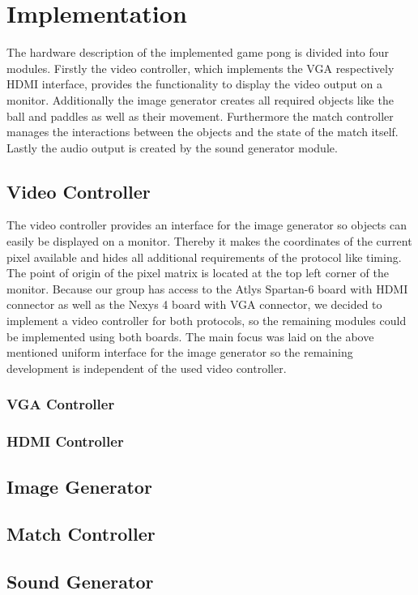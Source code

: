 \section{Implementation}
The hardware description of the implemented game pong is divided into four modules. Firstly the video controller, which implements the VGA respectively HDMI interface, provides the functionality to display the video output on a monitor. Additionally the image generator creates all required objects like the ball and paddles as well as their movement. Furthermore the match controller manages the interactions between the objects and the state of the match itself. Lastly the audio output is created by the sound generator module.
	\subsection{Video Controller}
    The video controller provides an interface for the image generator so objects can easily be displayed on a monitor. Thereby it makes the coordinates of the current pixel available and hides all additional requirements of the protocol like timing. The point of origin of the pixel matrix is located at the top left corner of the monitor. Because our group has access to the Atlys Spartan-6 board with HDMI connector as well as the Nexys 4 board with VGA connector, we decided to implement a video controller for both protocols, so the remaining modules could be implemented using both boards. The main focus was laid on the above mentioned uniform interface for the image generator so the remaining development is independent of the used video controller.
        \subsubsection{VGA Controller}
        \subsubsection{HDMI Controller}
    \subsection{Image Generator}
    \subsection{Match Controller}
    \subsection{Sound Generator}
